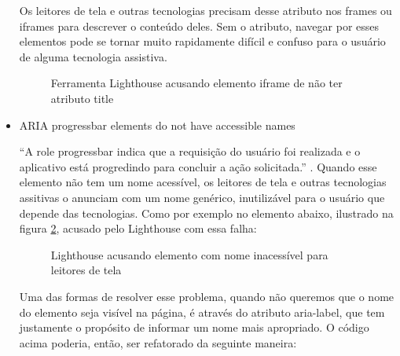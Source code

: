 \documentclass[
	12pt,				%
	openright,			%
	oneside,			%
	a4paper,			%
	chapter=TITLE,		%
	section=TITLE,		%
	subsection=TITLE,	%
	subsubsection=TITLE,%
	english,			%
	brazil				%
	]{abntex2}
\theoremstyle{definition}
\begin{document}
\begin{itemize}
Os leitores de tela e outras tecnologias precisam desse atributo nos frames ou iframes para descrever o conteúdo deles. Sem o atributo, navegar por esses elementos pode se tornar muito rapidamente difícil e confuso para o usuário de alguma tecnologia assistiva.

\begin{figure}[!h]
\centering
\caption{Ferramenta Lighthouse acusando elemento iframe de não ter atributo title}
\label{Ferramenta Lighthouse acusando elemento iframe de não ter atributo title}
\end{figure}

\pagebreak

 \item ARIA progressbar elements do not have accessible names
   
“A role progressbar indica que a requisição do usuário foi realizada e o aplicativo está progredindo para concluir a ação solicitada.” \cite{world2014accessible}. Quando esse elemento não tem um nome acessível, os leitores de tela e outras tecnologias assitivas o anunciam com um nome genérico, inutilizável para o usuário que depende das tecnologias. Como por exemplo no elemento abaixo, ilustrado na figura \ref{Lighthouse acusando elemento com nome inacessível para leitores de tela}, acusado pelo Lighthouse com essa falha:

\begin{figure}[!h]
\centering
\caption{Lighthouse acusando elemento com nome inacessível para leitores de tela}
\label{Lighthouse acusando elemento com nome inacessível para leitores de tela}
\end{figure}

Uma das formas de resolver esse problema, quando não queremos que o nome do elemento seja visível na página, é através do atributo aria-label, que tem justamente o propósito de informar um nome mais apropriado. O código acima poderia, então, ser refatorado da seguinte maneira:


\end{itemize}
\end{document}
